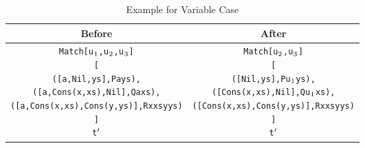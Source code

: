 \documentclass[11pt]{article}
\begin{document}
\begin{table}[h!]
\begin{center}
\begin{tabular}{|c|c|} \hline
{\bf Before} & {\bf After} \\ 
\hline
\begin{minipage}{3in}
 \begin{alltt}

Match [u\(\sb{1}\),u\(\sb{2}\),u\(\sb{3}\)]
  [
   ([a,Nil,ys],               P a ys),
   ([a,Cons(x,xs),Nil],       Q a xs),
   ([a,Cons(x,xs),Cons(y,ys)],R x xs y ys)
  ]
  t\(\sp{\prime}\) 

\end{alltt} 
\end {minipage} &
\begin{minipage}{3.2in}
 \begin{alltt}

Match [u\(\sb{2}\),u\(\sb{3}\)]
  [
   ([Nil,ys],               P u\(\sb{1}\) ys),
   ([Cons(x,xs),Nil],       Q u\(\sb{1}\) xs),
   ([Cons(x,xs),Cons(y,ys)],R x xs y ys)
  ]
  t\(\sp{\prime}\) 

\end{alltt} 
\end {minipage}
\tabularnewline
\hline
\end{tabular}
\caption{Example for Variable Case}
\label{exvarRule}
\end{center}
\end{table}
\end{document}
